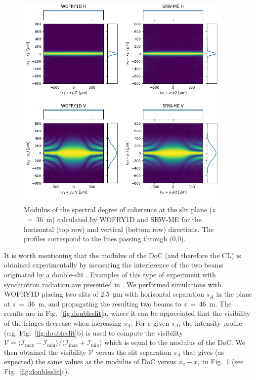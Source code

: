 \documentclass{iucr}              %
\begin{document}
\begin{figure}
    \label{fig:plot_DoC_at_36m}
    \includegraphics[width=0.95\textwidth]{figures/plot_DoC_at_36m.png}
    \caption{Modulus of the spectral degree of coherence at the slit plane ($z$~=~\SI{36}{\meter}) calculated by WOFRY1D and SRW-ME for the horizontal (top row) and vertical (bottom row) directions.
    The profiles correspond to the lines passing through (0,0).
    }
\end{figure}

It is worth mentioning that the modulus of the DoC (and therefore the CL) is obtained experimentally by measuring the interference of the two beams originated by a double-slit \cite{ThompsonWolf1957}. Examples of this type of experiment with synchrotron radiation are presented in \cite{Chang2000, Paterson2001, Leitenberger2003, Tran2005}. We performed simulations with WOFRY1D placing two slits of \SI{2.5}{\micro\meter} with horizontal separation $s_A$ in the plane at $z$~=~\SI{36}{\meter}, and propagating the resulting two beams to $z$~=~\SI{46}{\meter}. The results are in Fig.~\ref{fig:doubleslit}a, where it can be appreciated that the visibility of the fringes decrease when increasing $s_A$. For a given $s_A$, the intensity profile (e.g. Fig.~\ref{fig:doubleslit}b) is used to compute the visibility $\mathcal{V}=\langle \mathcal{I}_{\text{max}}-\mathcal{I}_{\text{min}} \rangle\big/\langle \mathcal{I}_{\text{max}}+\mathcal{I}_{\text{min}}\rangle$ which is equal to the modulus of the DoC. We then obtained the visibility $\mathcal{V}$ versus the slit separation $s_A$ that gives (as expected) the same values as the modulus of DoC versus $x_2-x_1$ in Fig.~\ref{fig:plot_DoC_at_36m} (see Fig.~\ref{fig:doubleslit}c). 
\end{document}
